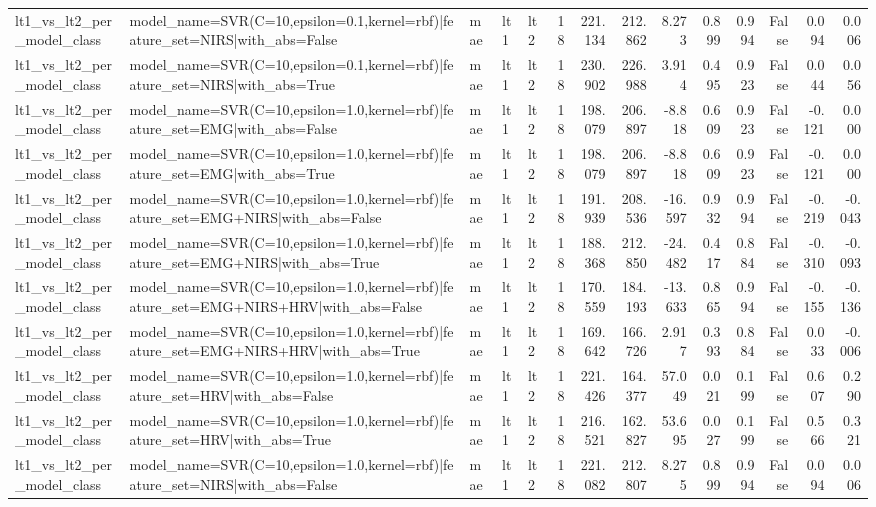 \begin{table}
\begin{tabular}{lllllrrrrrrrrr}
lt1_vs_lt2_per_model_class & model_name=SVR(C=10,epsilon=0.1,kernel=rbf)|feature_set=NIRS|with_abs=False & mae & lt1 & lt2 & 18 & 221.134 & 212.862 & 8.273 & 0.899 & 0.994 & False & 0.094 & 0.006 \\
lt1_vs_lt2_per_model_class & model_name=SVR(C=10,epsilon=0.1,kernel=rbf)|feature_set=NIRS|with_abs=True & mae & lt1 & lt2 & 18 & 230.902 & 226.988 & 3.914 & 0.495 & 0.923 & False & 0.044 & 0.056 \\
lt1_vs_lt2_per_model_class & model_name=SVR(C=10,epsilon=1.0,kernel=rbf)|feature_set=EMG|with_abs=False & mae & lt1 & lt2 & 18 & 198.079 & 206.897 & -8.818 & 0.609 & 0.923 & False & -0.121 & 0.000 \\
lt1_vs_lt2_per_model_class & model_name=SVR(C=10,epsilon=1.0,kernel=rbf)|feature_set=EMG|with_abs=True & mae & lt1 & lt2 & 18 & 198.079 & 206.897 & -8.818 & 0.609 & 0.923 & False & -0.121 & 0.000 \\
lt1_vs_lt2_per_model_class & model_name=SVR(C=10,epsilon=1.0,kernel=rbf)|feature_set=EMG+NIRS|with_abs=False & mae & lt1 & lt2 & 18 & 191.939 & 208.536 & -16.597 & 0.932 & 0.994 & False & -0.219 & -0.043 \\
lt1_vs_lt2_per_model_class & model_name=SVR(C=10,epsilon=1.0,kernel=rbf)|feature_set=EMG+NIRS|with_abs=True & mae & lt1 & lt2 & 18 & 188.368 & 212.850 & -24.482 & 0.417 & 0.884 & False & -0.310 & -0.093 \\
lt1_vs_lt2_per_model_class & model_name=SVR(C=10,epsilon=1.0,kernel=rbf)|feature_set=EMG+NIRS+HRV|with_abs=False & mae & lt1 & lt2 & 18 & 170.559 & 184.193 & -13.633 & 0.865 & 0.994 & False & -0.155 & -0.136 \\
lt1_vs_lt2_per_model_class & model_name=SVR(C=10,epsilon=1.0,kernel=rbf)|feature_set=EMG+NIRS+HRV|with_abs=True & mae & lt1 & lt2 & 18 & 169.642 & 166.726 & 2.917 & 0.393 & 0.884 & False & 0.033 & -0.006 \\
lt1_vs_lt2_per_model_class & model_name=SVR(C=10,epsilon=1.0,kernel=rbf)|feature_set=HRV|with_abs=False & mae & lt1 & lt2 & 18 & 221.426 & 164.377 & 57.049 & 0.021 & 0.199 & False & 0.607 & 0.290 \\
lt1_vs_lt2_per_model_class & model_name=SVR(C=10,epsilon=1.0,kernel=rbf)|feature_set=HRV|with_abs=True & mae & lt1 & lt2 & 18 & 216.521 & 162.827 & 53.695 & 0.027 & 0.199 & False & 0.566 & 0.321 \\
lt1_vs_lt2_per_model_class & model_name=SVR(C=10,epsilon=1.0,kernel=rbf)|feature_set=NIRS|with_abs=False & mae & lt1 & lt2 & 18 & 221.082 & 212.807 & 8.275 & 0.899 & 0.994 & False & 0.094 & 0.006 \\

\end{tabular}
\end{table}
